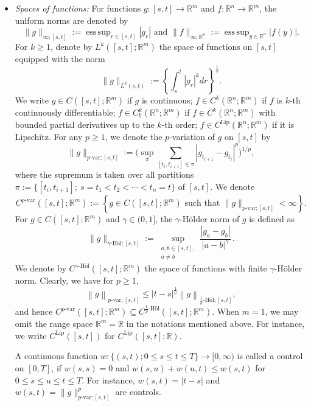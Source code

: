 \documentclass[11pt,reqno]{amsart}
\def\R{\mathbb R}
\DeclareMathOperator*{\esssup}{ess\,sup}
\numberwithin{equation}{section}
\begin{document}
\begin{itemize}
\item{\it Spaces of functions:} For  functions $g:[s,t]\rightarrow \mathbb{R}^{m}$ and $f:\mathbb{R}^{n}\rightarrow\mathbb{R}^{m}$, the uniform norms are denoted by
\[\|g\|_{\infty;[s,t]} := \esssup_{r\in[s,t]}|g_{r}|\text{ and }\|f\|_{\infty;\mathbb{R}^{n}} := \esssup_{y\in\mathbb{R}^{n}}|f(y)|.\]
For $k\ge 1$, denote by $L^{k}([s,t];\R^m)$ the space of functions on $[s,t]$ equipped with the norm
\begin{equation*}
\|g\|_{L^{k}(s,t)} := \left\{\int_{s}^{t} |g_{r}|^k dr\right\}^{\frac{1}{k}}.
\end{equation*}
We write 
$g\in C([s,t];\mathbb{R}^{m})$ if $g$ is continuous; $f\in C^{k}(\mathbb{R}^n;\mathbb{R}^{m})$ if $f$ is $k$-th continuously differentiable; $f\in C^{k}_{b}(\mathbb{R}^n;\mathbb{R}^{m})$ if $f\in C^{k}(\mathbb{R}^n;\mathbb{R}^{m})$ with bounded partial derivatives up to the $k$-th order; $f\in C^{\text{Lip}}(\mathbb{R}^n;\mathbb{R}^{m})$ if it is Lipschitz.
For any $p\ge 1$, we denote the $p$-variation of $g$ on $[s,t]$ by  
\[\|g\|_{p\text{-var};[s,t]}:= \Big(\sup_{\pi} \sum_{[t_{i},t_{i+1}]\in \pi}|g_{t_{i+1}}-g_{t_{i}}|^p \Big)^{1/p},\]
where the supremum is taken over all partitions $\pi:=\{[t_i,t_{i+1}];\  s=t_1<t_2<\cdots< t_n=t\}$ of $[s,t]$. We denote
\[C^{p\text{-var}}([s,t];\mathbb{R}^{m}) := \left\{g\in C([s,t];\mathbb{R}^{m})\text{ such that }\|g\|_{p\text{-var};[s,t]}<\infty \right\}.\]
For $g\in C([s,t];\R^m)$ and $\gamma\in(0,1]$, the $\gamma$-H\"older norm of $g$ is defined as
\begin{equation*}
\|g\|_{\gamma\text{-H\"ol};[s,t]} := \sup_{\substack{a,b\in[s,t], \\ a\neq b}} \frac{|g_{a} - g_{b}|}{|a-b|^{\gamma}}\,.
\end{equation*}
 We denote by $C^{\gamma\text{-H\"ol}}([s,t];\R^m)$ the space of functions with finite $\gamma$-H\"older norm.
Clearly, we have for $p\ge 1$,
\begin{equation}\label{e:p-var and Holder}
\left\|g\right\|_{p\text{-var};[s,t]} \le |t - s|^{\frac{1}{p}} \left\|g\right\|_{\frac{1}{p}\text{-H\"ol};[s,t]},
\end{equation}
and hence $C^{p\text{-var}}([s,t];\R^m)\subseteq C^{\frac{1}{p}\text{-H\"ol}}([s,t];\R^m)$. When $m=1$, we may omit the range space $\R^m=\R$ in the notations mentioned above. For instance, we  write $C^{\text{Lip}}([s,t])$ for $C^{\text{Lip}}([s,t];\mathbb{R})$. 
  
A continuous function $w: \{(s,t); 0 \leq s\le t \le T\} \rightarrow [0,\infty)$  is called a control on $[0,T]$, if  $w(s,s)=0$ and $w(s,u) + w(u,t) \le w(s,t)$ for $0\le s\le u\le t\le T$.    For instance, $w(s,t)=|t-s|$ and  $w(s,t) = \|g\|_{p\text{-var};[s,t]}^{p}$ are controls. \\



\end{itemize}
\end{document}
